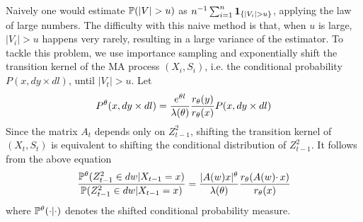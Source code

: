 
Naively one would estimate $\P(|V| > u)$ as
$n^{-1} \sum_{i=1}^n \1{|V_i| > u}$, applying the law of large
numbers. The difficulty with this naive method is that, when $u$ is
large, $|V_i| > u$ happens very rarely, resulting in a large variance
of the estimator. To tackle this problem, we use importance sampling
and exponentially shift the transition kernel of the MA process
$(X_i, S_i)$, i.e. the conditional probability $P(x, dy \times dl)$,
until $|V_t| > u$. Let
\[
P^\theta(x, dy \times dl)
=
{e^{\theta l} \over \lambda(\theta)}
{r_\theta(y) \over r_\theta(x)}
P(x, dy \times dl)
\]
Since the matrix $A_t$ depends only on $Z_{t-1}^2$, shifting the
transition kernel of $(X_t, S_t)$ is equivalent to shifting the
conditional distribution of $Z_{t-1}^2$. It follows from the above
equation
\[
{
  \P^\theta(Z_{t-1}^2 \in dw | X_{t-1} = x)
  \over
  \P(Z_{t-1}^2 \in dw | X_{t-1} = x)
} = {|A(w) x|^\theta \over \lambda(\theta)}
{
  r_\theta (A(w) \cdotp x)
  \over
  r_\theta(x)
}
\]
where $\P^\theta(\cdot | \cdot)$ denotes the shifted conditional
probability measure.

